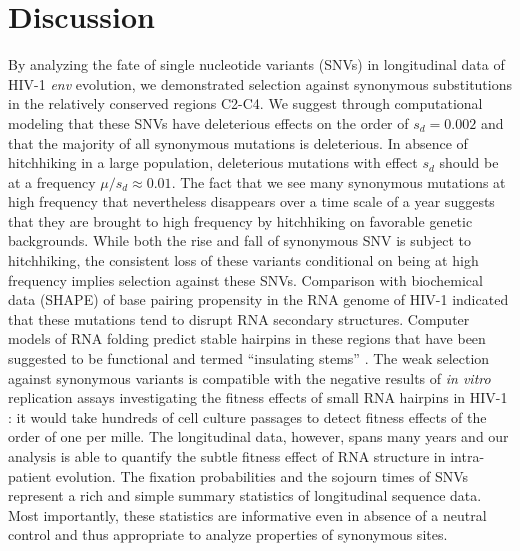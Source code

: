 \documentclass[11pt]{article}
\newcommand{\env}{\textit{env}}
\begin{document}
\section*{Discussion}
By analyzing the fate of single nucleotide variants (SNVs) in
longitudinal data of HIV-1 \env{} evolution, we demonstrated selection
against synonymous substitutions in the relatively conserved regions
C2-C4. We suggest through computational modeling that these SNVs have
deleterious effects on the order of $s_d = 0.002$ and that the majority
of all synonymous mutations is deleterious. In absence of hitchhiking
in a large population, deleterious mutations with effect $s_d$ should be
at a frequency $\mu/s_d\approx 0.01$. The fact that we see many
synonymous mutations at high frequency that nevertheless disappears over
a time scale of a year suggests that they are brought to high frequency
by hitchhiking on favorable genetic backgrounds. 
While both the rise and fall of synonymous SNV is subject to hitchhiking,
the consistent loss of these variants conditional on being at high
frequency implies selection against these SNVs.
Comparison with biochemical data (SHAPE) of base pairing propensity in the RNA
genome of HIV-1 indicated that these mutations tend to disrupt RNA 
secondary structures\citep{watts_architecture_2009}. Computer models
of RNA folding predict stable hairpins in these regions that
have been suggested to be functional and termed ``insulating
stems'' \citep{watts_architecture_2009, sanjuan_interplay_2011}.
The weak selection against synonymous variants is compatible with the
negative results of \textit{in vitro} replication assays investigating
the fitness effects of small RNA hairpins in HIV-1
\citep{knoepfel_role_2013}: it would take hundreds of cell culture
passages to detect fitness effects of the order of one per mille. The longitudinal data,
however, spans many years and our analysis is able to quantify the
subtle fitness effect of RNA structure in intra-patient evolution. 
The fixation probabilities and the sojourn times of SNVs represent a
rich and simple summary statistics of longitudinal sequence data. Most
importantly, these statistics are informative even in absence of a
neutral control and thus appropriate to analyze properties of synonymous
sites. 
\end{document}
